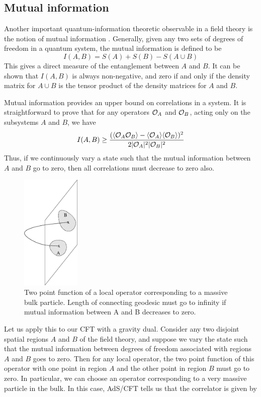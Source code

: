 \documentclass[12pt,epsf]{article}
\newcommand{\be}{\begin{equation}}
\newcommand{\ee}{\end{equation}}
\renewcommand{\(}{\left(}
\renewcommand{\)}{\right)}
\begin{document}
\subsection{Mutual information}

Another important quantum-information theoretic observable in a field theory is the notion of mutual information \cite{nc}. Generally, given any two sets of degrees of freedom in a quantum system, the mutual information is defined to be
\[
I(A,B) = S(A) + S(B) - S(A \cup B)
\]
This gives a direct measure of the entanglement between $A$ and $B$. It can be shown that $I(A,B)$ is always non-negative, and zero if and only if the density matrix for $A \cup B$ is the tensor product of the density matrices for $A$ and $B$.

Mutual information provides an upper bound on correlations in a system. It is straightforward to prove \cite{wvhc} that for any operators ${\cal O}_A$ and ${\cal O}_B$, acting only on the subsystems $A$ and $B$, we have
\be
\label{corrbound}
I(A,B) \ge \frac{(\langle {\cal O}_A {\cal O}_B \rangle - \langle {\cal O}_A \rangle \langle {\cal O}_B \rangle  )^2}{2|{\cal O}_A|^2 |{\cal O}_B|^2}
\ee
Thus, if we continuously vary a state such that the mutual information between $A$ and $B$ go to zero, then all correlations must decrease to zero also.
\begin{figure}
\centering
\includegraphics[width=0.25\textwidth]{mutual.eps}
\caption{Two point function of a local operator corresponding to a massive bulk particle. Length of connecting geodesic must go to infinity if mutual information between A and B decreases to zero.}
\end{figure}
Let us apply this to our CFT with a gravity dual. Consider any two disjoint spatial regions $A$ and $B$ of the field theory, and suppose we vary the state such that the mutual information between degrees of freedom associated with regions $A$ and $B$ goes to zero. Then for any local operator, the two point function of this operator with one point in region $A$ and the other point in region $B$ must go to zero. In particular, we can choose an operator corresponding to a very massive particle in the bulk. In this case, AdS/CFT tells us that the correlator is given by \cite{agmoo}
\end{document}
